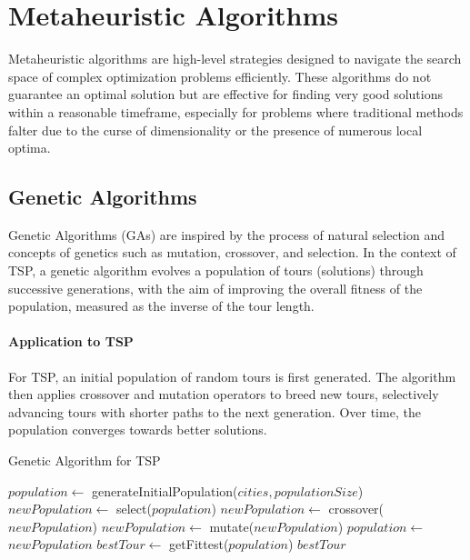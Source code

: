 \section{Metaheuristic Algorithms}

Metaheuristic algorithms are high-level strategies designed to navigate the search space of complex optimization problems efficiently. These algorithms do not guarantee an optimal solution but are effective for finding very good solutions within a reasonable timeframe, especially for problems where traditional methods falter due to the curse of dimensionality or the presence of numerous local optima.

\subsection{Genetic Algorithms}

Genetic Algorithms (GAs) are inspired by the process of natural selection and concepts of genetics such as mutation, crossover, and selection. In the context of TSP, a genetic algorithm evolves a population of tours (solutions) through successive generations, with the aim of improving the overall fitness of the population, measured as the inverse of the tour length.

\paragraph{Application to TSP}

For TSP, an initial population of random tours is first generated. The algorithm then applies crossover and mutation operators to breed new tours, selectively advancing tours with shorter paths to the next generation. Over time, the population converges towards better solutions.

\begin{algorithm}
	\caption{Genetic Algorithm for TSP}\label{alg:geneticalgorithm}
	\begin{algorithmic}[1]
		\State $population \gets$ generateInitialPopulation($cities, populationSize$)
		\State $newPopulation \gets$ select($population$)
		\State $newPopulation \gets$ crossover($newPopulation$)
		\State $newPopulation \gets$ mutate($newPopulation$)
		\State $population \gets$ $newPopulation$
		\EndFor
		\State $bestTour \gets$ getFittest($population$)
		\State \Return $bestTour$
		\EndProcedure
	\end{algorithmic}
\end{algorithm}

